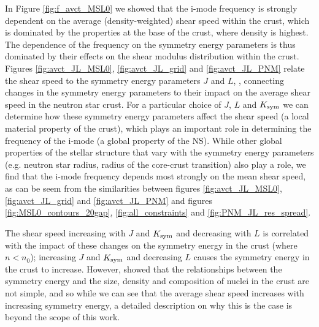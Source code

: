 \documentclass[fleqn,usenatbib]{mnras}
\begin{document}
In Figure \ref{fig:f_avct_MSL0} we showed that the i-mode frequency is strongly dependent on the average (density-weighted) shear speed within the crust, which is dominated by the properties at the base of the crust, where density is highest. The dependence of the frequency on the symmetry energy parameters is thus dominated by their effects on the shear modulus distribution within the crust.
Figures \ref{fig:avct_JL_MSL0}, \ref{fig:avct_JL_grid} and \ref{fig:avct_JL_PNM} relate the shear speed to the symmetry energy parameters $J$ and $L$, \citep[similar to Figure 1 of ][]{steiner2009constraints}, connecting changes in the symmetry energy parameters to their impact on the average shear speed in the neutron star crust.  For a particular choice of $J$, $L$ and $K_{\rm sym}$ we can determine how these symmetry energy parameters affect the shear speed (a local material property of the crust), which plays an important role in determining the frequency of the i-mode (a global property of the NS). While other global properties of the stellar structure that vary with the symmetry energy parameters (e.g. neutron star radius, radius of the core-crust transition) also play a role, we find that the i-mode frequency depends most strongly on the mean shear speed, as can be seem from the similarities between figures \ref{fig:avct_JL_MSL0}, \ref{fig:avct_JL_grid} and \ref{fig:avct_JL_PNM} and figures \ref{fig:MSL0_contours_20gap}, \ref{fig:all_constraints} and \ref{fig:PNM_JL_res_spread}.



The shear speed increasing with $J$ and $K_{\rm sym}$ and decreasing with $L$ is correlated with the impact of these changes on the symmetry energy in the crust (where $n<n_0$); increasing $J$ and $K_{\rm sym}$ and decreasing $L$ causes the symmetry energy in the crust to increase. However, \citet{steiner2009neutron} showed that the relationships between the symmetry energy and the size, density and composition of nuclei in the crust are not simple, and so while we can see that the average shear speed increases with increasing symmetry energy, a detailed description on why this is the case is beyond the scope of this work.

\end{document}
